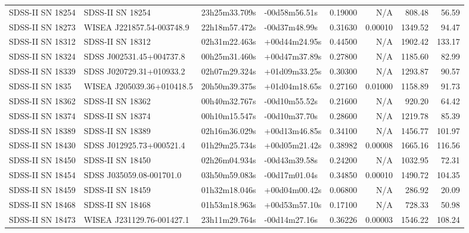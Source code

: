 \begin{longtable}{llllrrrr}
SDSS-II SN 18254 &                SDSS-II SN 18254 &   23h25m33.709s &   -00d58m56.51s &  0.19000 &      N/A &   808.48 &       56.59 \\
SDSS-II SN 18273 &       WISEA J221857.54-003748.9 &   22h18m57.472s &   -00d37m48.99s &  0.31630 &  0.00010 &  1349.52 &       94.47 \\
SDSS-II SN 18312 &                SDSS-II SN 18312 &   02h31m22.463s &   +00d44m24.95s &  0.44500 &      N/A &  1902.42 &      133.17 \\
SDSS-II SN 18324 &        SDSS J002531.45+004737.8 &   00h25m31.460s &   +00d47m37.89s &  0.27800 &      N/A &  1185.60 &       82.99 \\
SDSS-II SN 18339 &        SDSS J020729.31+010933.2 &   02h07m29.324s &   +01d09m33.25s &  0.30300 &      N/A &  1293.87 &       90.57 \\
SDSS-II SN 1835  &       WISEA J205039.36+010418.5 &   20h50m39.375s &   +01d04m18.65s &  0.27160 &  0.01000 &  1158.89 &       91.73 \\
SDSS-II SN 18362 &                SDSS-II SN 18362 &   00h40m32.767s &   -00d10m55.52s &  0.21600 &      N/A &   920.20 &       64.42 \\
SDSS-II SN 18374 &                SDSS-II SN 18374 &   00h10m15.547s &   -00d10m37.70s &  0.28600 &      N/A &  1219.78 &       85.39 \\
SDSS-II SN 18389 &                SDSS-II SN 18389 &   02h16m36.029s &   +00d13m46.85s &  0.34100 &      N/A &  1456.77 &      101.97 \\
SDSS-II SN 18430 &        SDSS J012925.73+000521.4 &   01h29m25.734s &   +00d05m21.42s &  0.38982 &  0.00008 &  1665.16 &      116.56 \\
SDSS-II SN 18450 &                SDSS-II SN 18450 &   02h26m04.934s &   -00d43m39.58s &  0.24200 &      N/A &  1032.95 &       72.31 \\
SDSS-II SN 18454 &        SDSS J035059.08-001701.0 &   03h50m59.083s &   -00d17m01.04s &  0.34850 &  0.00010 &  1490.72 &      104.35 \\
SDSS-II SN 18459 &                SDSS-II SN 18459 &   01h32m18.046s &   +00d04m00.42s &  0.06800 &      N/A &   286.92 &       20.09 \\
SDSS-II SN 18468 &                SDSS-II SN 18468 &   01h53m18.963s &   +00d53m57.10s &  0.17100 &      N/A &   728.33 &       50.98 \\
SDSS-II SN 18473 &       WISEA J231129.76-001427.1 &   23h11m29.764s &   -00d14m27.16s &  0.36226 &  0.00003 &  1546.22 &      108.24 \\

\end{longtable}
